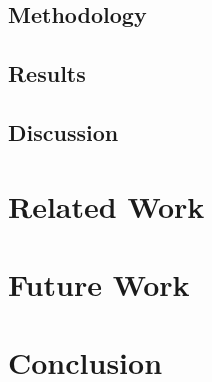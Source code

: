 \documentclass[conference]{IEEEtran}
\begin{document}
\subsection{Methodology}
\subsection{Results}
\subsection{Discussion}

\section{Related Work}

\section{Future Work}

\section{Conclusion}

%
%




\end{document}
